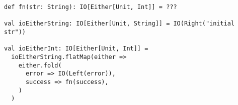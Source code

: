 \begin{algorithm}

\begin{verbatim}
def fn(str: String): IO[Either[Unit, Int]] = ???

val ioEitherString: IO[Either[Unit, String]] = IO(Right("initial str"))

val ioEitherInt: IO[Either[Unit, Int]] =
  ioEitherString.flatMap(either =>
    either.fold(
      error => IO(Left(error)),
      success => fn(success),
    )
  )
\end{verbatim}

\caption{Syntax overhead of nesting Either and IO monads %
\label{monadtransformer:io-either}}
\end{algorithm}